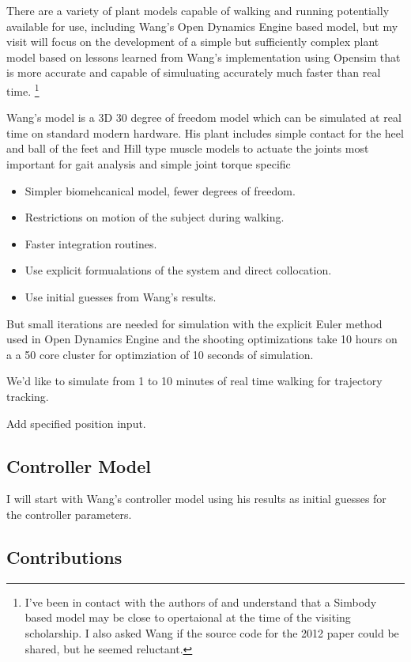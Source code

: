 \documentclass[11pt]{article}
\begin{document}
There are a variety of plant models capable of walking and running potentially
available for use, including Wang's Open Dynamics Engine based model, but my
visit will focus on the development of a simple but sufficiently complex plant
model based on lessons learned from Wang's implementation using Opensim that is
more accurate and capable of simuluating accurately much faster than real time.
\footnote{I've been in contact with the authors of \cite{Wang2012} and
understand that a Simbody based model may be close to opertaional at the time
of the visiting scholarship. I also asked Wang if the source code for the 2012
paper could be shared, but he seemed reluctant.}

Wang's model is a 3D 30 degree of freedom model which can be simulated at real
time on standard modern hardware. His plant includes simple contact for the
heel and ball of the feet and Hill type muscle models to actuate the joints
most important for gait analysis and simple joint torque specific

\begin{itemize}
  \item Simpler biomehcanical model, fewer degrees of freedom.
  \item Restrictions on motion of the subject during walking.
  \item Faster integration routines.
  \item Use explicit formualations of the system and direct collocation.
  \item Use initial guesses from Wang's results.
\end{itemize}

But small iterations are needed for
simulation with the explicit Euler method used in Open Dynamics Engine and the
shooting optimizations take 10 hours on a a 50 core cluster for optimziation of
10 seconds of simulation.

We'd like to simulate from 1 to 10 minutes of real time walking for trajectory
tracking.

Add specified position input.

\subsection{Controller Model}

I will start with Wang's controller model using his results as initial guesses
for the controller parameters.

\subsection{Contributions}
\end{document}

